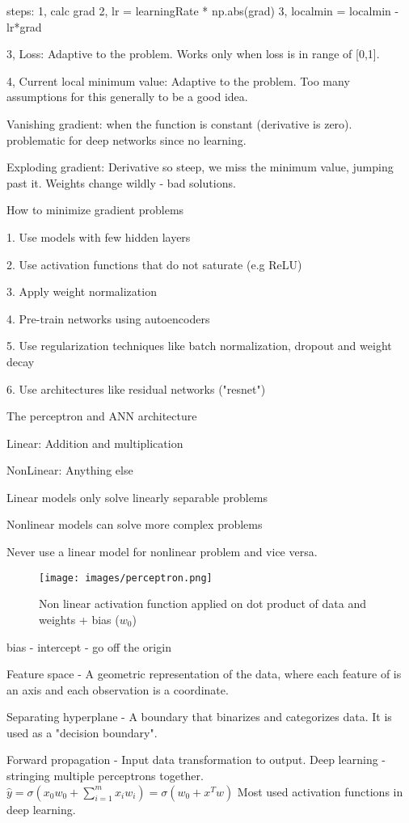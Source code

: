\documentclass[30pt, a4]{article}
\begin{document}
steps:
1, calc grad
2, lr = learningRate * np.abs(grad)
3, localmin = localmin - lr*grad

3, Loss: Adaptive to the problem. Works only when loss is in range of [0,1].

4, Current local minimum value: Adaptive to the problem. Too many assumptions
for this generally to be a good idea.

Vanishing gradient: when the function is constant (derivative is zero).
problematic for deep networks since no learning.

Exploding gradient: Derivative so steep, we miss the minimum value, jumping past
it. Weights change wildly - bad solutions.

How to minimize gradient problems

1. Use models with few hidden layers

2. Use activation functions that do not saturate (e.g ReLU)

3. Apply weight normalization

4. Pre-train networks using autoencoders

5. Use regularization techniques like batch normalization, dropout and weight
decay

6. Use architectures like residual networks ("resnet")

The perceptron and ANN architecture

Linear: Addition and multiplication

NonLinear: Anything else

Linear models only solve linearly separable problems

Nonlinear models can solve more complex problems

Never use a linear model for nonlinear problem and vice versa.

\begin{figure*}[htp]
    \centering
    \texttt{[image: images/perceptron.png]}
    \caption{Non linear activation function applied on dot product of data and weights + bias ($w_0$)}
\end{figure*}

bias - intercept - go off the origin 

Feature space - A geometric representation of the data, where each feature of
is an axis and each observation is a coordinate.

Separating hyperplane - A boundary that binarizes and categorizes data. It is 
used as a "decision boundary".

Forward propagation - Input data transformation to output. Deep learning - 
stringing multiple perceptrons together. 
{
\Large
$\hat y = \sigma(x_0w_0+\sum \limits_{i=1}^m x_iw_i) = \sigma(w_0 + x^T w)$
}
Most used activation functions in deep learning.
\end{document}
